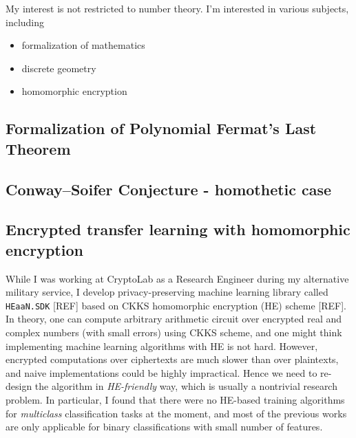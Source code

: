 \documentclass[12pt]{article}
\begin{document}
My interest is not restricted to number theory. I'm interested in various subjects, including
\begin{itemize}
    \item formalization of mathematics
    \item discrete geometry
    \item homomorphic encryption
\end{itemize}




\subsection*{Formalization of Polynomial Fermat's Last Theorem}

\subsection*{Conway--Soifer Conjecture - homothetic case}


\subsection*{Encrypted transfer learning with homomorphic encryption}

While I was working at CryptoLab as a Research Engineer during my alternative military service, I develop privacy-preserving machine learning library called \texttt{HEaaN.SDK} [REF] based on CKKS homomorphic encryption (HE) scheme [REF].
In theory, one can compute arbitrary arithmetic circuit over encrypted real and complex numbers (with small errors) using CKKS scheme, and one might think implementing machine learning algorithms with HE is not hard.
However, encrypted computations over ciphertexts are much slower than over plaintexts, and naive implementations could be highly impractical.
Hence we need to re-design the algorithm in \emph{HE-friendly} way, which is usually a nontrivial research problem.
In particular, I found that there were no HE-based training algorithms for \emph{multiclass} classification tasks at the moment, and most of the previous works are only applicable for binary classifications with small number of features.
\end{document}
